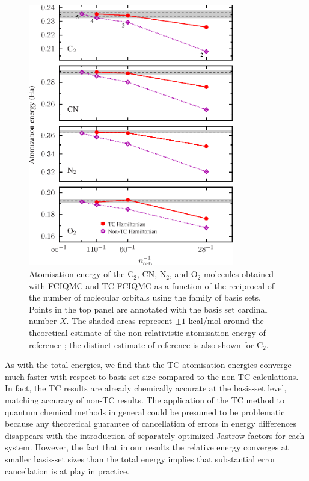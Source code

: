 %
\begin{figure}[!hbt]
  \begin{center}
    \includegraphics[width=0.8\textwidth]{figures/optimisation/Fig/bsdep-dimers-nontc}
    \caption{
      Atomisation energy of the C$_2$, CN, N$_2$, and O$_2$ molecules
      obtained with FCIQMC and TC-FCIQMC as a function of the
      reciprocal of the number of molecular orbitals using the
       family of basis sets.
      Points in the top panel are annotated with the basis set
      cardinal number $X$.
      The shaded areas represent $\pm 1$ kcal/mol around the
      theoretical estimate of the non-relativistic atomisation energy
      of reference ; the distinct
      estimate of reference  is also
      shown for C$_2$.
    }
    \label{fig:bsdep-dimers-nontc}
  \end{center}
\end{figure}

As with the total energies, we find that the TC atomisation energies converge much faster with respect to basis-set size compared to the non-TC calculations. In fact, the TC results are already chemically accurate at the \vtz basis-set level, matching accuracy of  non-TC results. The application of the TC method to quantum chemical methods in
general could be presumed to be problematic because any theoretical
guarantee of cancellation of errors in energy differences disappears
with the introduction of separately-optimized Jastrow factors for each
system.
%
However, the fact that in our results the relative energy converges at
smaller basis-set sizes than the total energy implies that substantial
error cancellation is at play in practice.

